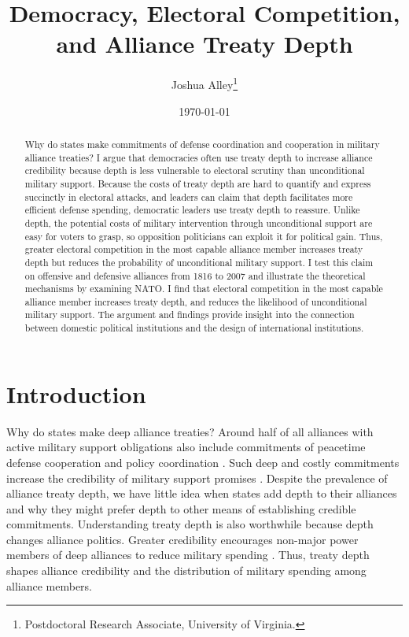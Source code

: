 \documentclass[12pt]{article}
\title{\textbf{Democracy, Electoral Competition, and Alliance Treaty Depth}}
\author{Joshua Alley\footnote{Postdoctoral Research Associate,
University of Virginia.}}
\date{\today}
\begin{document}
\maketitle 

\doublespace 

\begin{abstract}
Why do states make commitments of defense coordination and cooperation in military alliance treaties? 
I argue that democracies often use treaty depth to increase alliance credibility because depth is less vulnerable to electoral scrutiny than unconditional military support. 
Because the costs of treaty depth are hard to quantify and express succinctly in electoral attacks, and leaders can claim that depth facilitates more efficient defense spending, democratic leaders use treaty depth to reassure. 
Unlike depth, the potential costs of military intervention through unconditional support are easy for voters to grasp, so opposition politicians can exploit it for political gain. 
Thus, greater electoral competition in the most capable alliance member increases treaty depth but reduces the probability of unconditional military support. 
I test this claim on offensive and defensive alliances from 1816 to 2007 and illustrate the theoretical mechanisms by examining NATO. 
I find that electoral competition in the most capable alliance member increases treaty depth, and reduces the likelihood of unconditional military support. 
The argument and findings provide insight into the connection between domestic political institutions and the design of international institutions. 
\end{abstract}


\newpage 


\section{Introduction}


Why do states make deep alliance treaties? 
Around half of all alliances with active military support obligations also include commitments of peacetime defense cooperation and policy coordination \citep{Leedsetal2002}. 
Such deep and costly commitments increase the credibility of military support promises \citep{Morrow1994}. 
Despite the prevalence of alliance treaty depth, we have little idea when states add depth to their alliances and why they might prefer depth to other means of establishing credible commitments.
Understanding treaty depth is also worthwhile because depth changes alliance politics. 
Greater credibility encourages non-major power members of deep alliances to reduce military spending \citep{Alley2020}.  
Thus, treaty depth shapes alliance credibility and the distribution of military spending among alliance members. 
\end{document}
